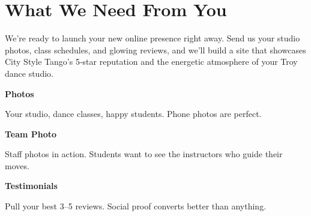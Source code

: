\documentclass[11pt,letterpaper]{article}
\begin{document}
\vspace{0.2em}

\section*{What We Need From You}

We’re ready to launch your new online presence right away. Send us your studio photos, class schedules, and glowing reviews, and we’ll build a site that showcases City Style Tango’s 5‑star reputation and the energetic atmosphere of your Troy dance studio.

\vspace{0.12em}

\noindent\begin{minipage}[t]{0.48\textwidth}
\begin{tcolorbox}[colframe=accent-teal, boxrule=1pt, left=0.7em, right=0.7em, top=0.5em, bottom=0.5em, arc=4pt, boxsep=0pt]
{\bfseries\small\color{accent-teal}Photos}

\vspace{0.15em}

{\small Your studio, dance classes, happy students. Phone photos are perfect.}
\end{tcolorbox}

\vspace{0.1em}

\begin{tcolorbox}[colframe=accent-teal, boxrule=1pt, left=0.7em, right=0.7em, top=0.5em, bottom=0.5em, arc=4pt, boxsep=0pt]
{\bfseries\small\color{accent-teal}Team Photo}

\vspace{0.15em}

{\small Staff photos in action. Students want to see the instructors who guide their moves.}
\end{tcolorbox}

\vspace{0.1em}

\begin{tcolorbox}[colframe=accent-teal, boxrule=1pt, left=0.7em, right=0.7em, top=0.5em, bottom=0.5em, arc=4pt, boxsep=0pt]
{\bfseries\small\color{accent-teal}Testimonials}

\vspace{0.15em}

{\small Pull your best 3--5 reviews. Social proof converts better than anything.}
\end{tcolorbox}
\end{minipage}
\end{document}
